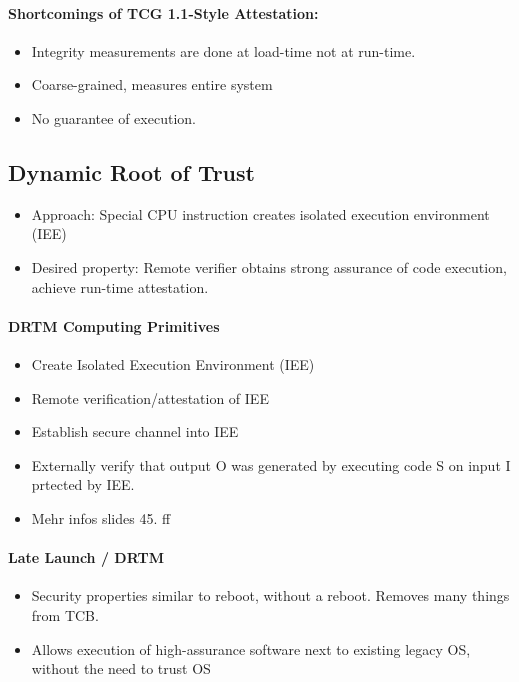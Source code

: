 \paragraph{Shortcomings of TCG 1.1-Style Attestation: }
\begin{itemize}
    \item Integrity measurements are done at load-time not at run-time.
    \item Coarse-grained, measures entire system
    \item No guarantee of execution.
\end{itemize}{}

\subsection{Dynamic Root of Trust}
\begin{itemize}
    \item Approach: Special CPU instruction creates isolated execution environment (IEE)
    \item Desired property: Remote verifier obtains strong assurance of code execution, achieve run-time attestation.
\end{itemize}{}

\paragraph{DRTM Computing Primitives}
\begin{itemize}
    \item Create Isolated Execution Environment (IEE)
    \item Remote verification/attestation of IEE
    \item Establish secure channel into IEE
    \item Externally verify that output O was generated by executing code S on input I prtected by IEE.
    \item Mehr infos slides 45. ff
\end{itemize}{}

\paragraph{Late Launch / DRTM}
\begin{itemize}
    \item Security properties similar to reboot, without a reboot. Removes many things from TCB.
    \item Allows execution of high-assurance software next to existing legacy OS, without the need to trust OS
\end{itemize}{}

